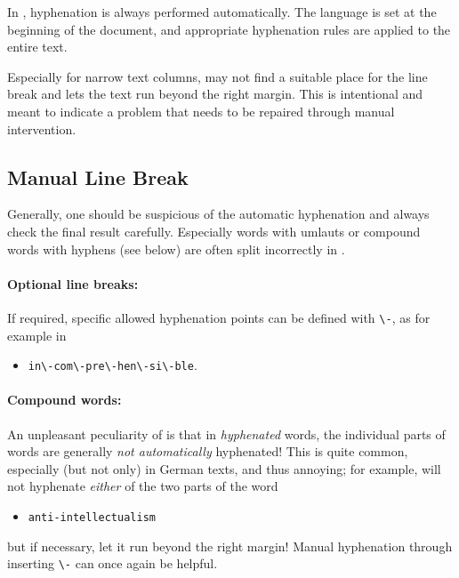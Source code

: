 In \latex, hyphenation is always performed automatically. The language is set at
the beginning of the document, and appropriate hyphenation rules are applied to
the entire text.

Especially for narrow text columns, \latex may not find a suitable place for the
line break and lets the text run beyond the right margin. This is intentional
and meant to indicate a problem that needs to be repaired through manual
intervention.

\subsection{Manual Line Break}

Generally, one should be suspicious of the automatic hyphenation and always
check the final result carefully. Especially words with umlauts or compound
words with hyphens (see below) are often split incorrectly in \latex.

\paragraph{Optional line breaks:} If required, specific allowed hyphenation
points can be defined with \verb!\-!, as for example in
%
\begin{itemize}
    \item[] \verb!in\-com\-pre\-hen\-si\-ble!.
\end{itemize}

\paragraph{Compound words:} An unpleasant peculiarity of \latex is that in
\emph{hyphenated} words, the individual parts of words are generally \emph{not
automatically} hyphenated! This is quite common, especially (but not only) in
German texts, and thus annoying; for example, \latex will not hyphenate
\emph{either} of the two parts of the word
%
\begin{itemize}
    \item[] \verb!anti-intellectualism!
\end{itemize}
%
but if necessary, let it run beyond the right margin! Manual hyphenation through
inserting \verb!\-! can once again be helpful.

